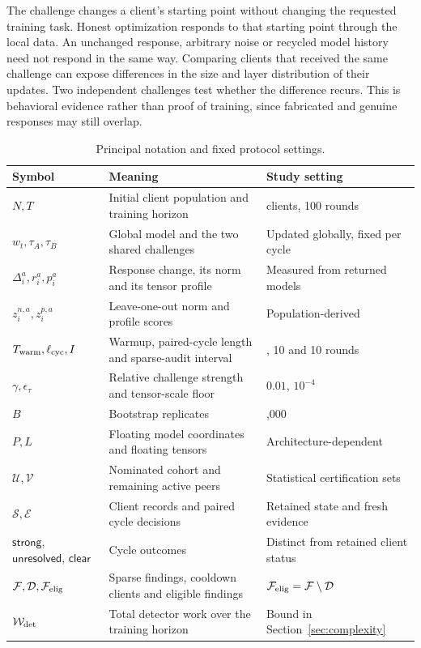 \documentclass[journal]{IEEEtran}
\begin{document}
The challenge changes a client's starting point without changing the
requested training task. Honest optimization responds to that starting
point through the local data. An unchanged response, arbitrary noise or
recycled model history need not respond in the same way. Comparing
clients that received the same challenge can expose differences in the
size and layer distribution of their updates. Two independent challenges
test whether the difference recurs. This is behavioral evidence rather
than proof of training, since fabricated and genuine responses may still
overlap.

\begin{table}[t]\centering\footnotesize
\renewcommand{\arraystretch}{1.05}
\caption{Principal notation and fixed protocol settings.}\label{tab:notation-settings}
\begin{tabular}{>{\raggedright\arraybackslash}p{3.1cm}>{\raggedright\arraybackslash}p{8.0cm}>{\raggedright\arraybackslash}p{4.8cm}}\toprule
Symbol & Meaning & Study setting \\ \midrule
$N,T$ & Initial client population and training horizon & 100 clients, 100 rounds \\
$w_t,\tau_A,\tau_B$ & Global model and the two shared challenges & Updated globally, fixed per cycle \\
$\Delta_i^a,r_i^a,p_i^a$ & Response change, its norm and its tensor profile & Measured from returned models \\
$z_i^{n,a},z_i^{p,a}$ & Leave-one-out norm and profile scores & Population-derived \\
$T_{\rm warm},\ell_{\rm cyc},I$ & Warmup, paired-cycle length and sparse-audit interval & 10, 10 and 10 rounds \\
$\gamma,\epsilon_\tau$ & Relative challenge strength and tensor-scale floor & $0.01$, $10^{-4}$ \\
$B$ & Bootstrap replicates & 1,000 \\
$P,L$ & Floating model coordinates and floating tensors & Architecture-dependent \\
$\mathcal U,\mathcal V$ & Nominated cohort and remaining active peers & Statistical certification sets \\
$\mathcal S,\mathcal E$ & Client records and paired cycle decisions & Retained state and fresh evidence \\
$\mathsf{strong}$, $\mathsf{unresolved}$, $\mathsf{clear}$ & Cycle outcomes & Distinct from retained client status \\
$\mathcal F,\mathcal D,\mathcal F_{\rm elig}$ & Sparse findings, cooldown clients and eligible findings & $\mathcal F_{\rm elig}=\mathcal F\setminus\mathcal D$ \\
$\mathcal W_{\rm det}$ & Total detector work over the training horizon & Bound in Section~\ref{sec:complexity} \\
\bottomrule\end{tabular}
\end{table}
\end{document}
